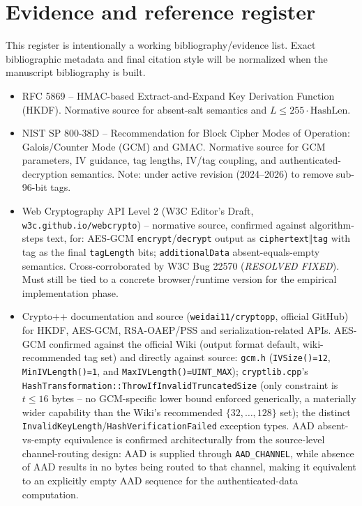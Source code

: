 \documentclass[11pt,a4paper]{article}
\begin{document}
\section{Evidence and reference register}
This register is intentionally a working bibliography/evidence list. Exact bibliographic metadata and final citation style will be normalized when the manuscript bibliography is built.
\begin{itemize}
\item RFC 5869 -- HMAC-based Extract-and-Expand Key Derivation Function (HKDF). Normative source for absent-salt semantics and $L\le 255\cdot\text{HashLen}$.
\item NIST SP 800-38D -- Recommendation for Block Cipher Modes of Operation: Galois/Counter Mode (GCM) and GMAC. Normative source for GCM parameters, IV guidance, tag lengths, IV/tag coupling, and authenticated-decryption semantics. Note: under active revision (2024--2026) to remove sub-96-bit tags.
\item Web Cryptography API Level 2 (W3C Editor's Draft, \texttt{w3c.github.io/webcrypto}) -- normative source, confirmed against algorithm-steps text, for: AES-GCM \texttt{encrypt}/\texttt{decrypt} output as \texttt{ciphertext}$\Vert$\texttt{tag} with tag as the final \texttt{tagLength} bits; \texttt{additionalData} absent-equals-empty semantics. Cross-corroborated by W3C Bug 22570 (\emph{RESOLVED FIXED}). Must still be tied to a concrete browser/runtime version for the empirical implementation phase.
\item Crypto++ documentation and source (\texttt{weidai11/cryptopp}, official GitHub) for HKDF, AES-GCM, RSA-OAEP/PSS and serialization-related APIs. AES-GCM confirmed against the official Wiki (output format default, wiki-recommended tag set) and directly against source: \texttt{gcm.h} (\texttt{IVSize()=12}, \texttt{MinIVLength()=1}, and
\texttt{MaxIVLength()=UINT\_MAX}); \texttt{cryptlib.cpp}'s \texttt{HashTransformation::ThrowIfInvalidTruncatedSize} (only constraint is $t \le 16$ bytes -- no GCM-specific lower bound enforced generically, a materially wider capability than the Wiki's recommended $\{32,\ldots,128\}$ set); the distinct \texttt{InvalidKeyLength}/\texttt{HashVerificationFailed} exception types. AAD absent-vs-empty equivalence is confirmed architecturally from the source-level channel-routing design: AAD is supplied through \texttt{AAD\_CHANNEL}, while absence of AAD results in no bytes being routed to that channel, making it equivalent to an explicitly empty AAD sequence for the authenticated-data computation.

\end{itemize}
\end{document}
